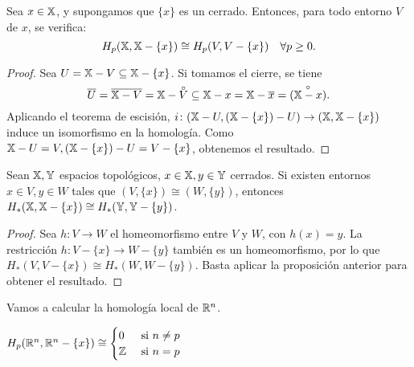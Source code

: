 \begin{proposition}
  Sea $x \in {\mathbb X}$, y supongamos que $\{x\}$ es un cerrado. Entonces, para todo entorno $V$ de $x$, se verifica:
  \[ H_p({\mathbb X}, {\mathbb X} - \{x\}) \cong H_p(V, V - \{x\}) \quad \forall p \geq 0. \]
\end{proposition}

\begin{proof}
  Sea $U = {\mathbb X} - V \subseteq {\mathbb X} - \{x\}$. Si tomamos el cierre, se tiene
  \[ \overline{U} = \overline{\X - V} = \X - \interior{V} \subseteq \X - x = \X - \overline{x} = \interior{(\X - x)} .\]
  Aplicando el teorema de escisión, $i \colon ({\mathbb X} - U, ({\mathbb X} - \{x\}) - U) \to ({\mathbb X}, {\mathbb X} - \{x\})$ induce un isomorfismo en la homología.
  Como ${\mathbb X} - U = V, ({\mathbb X} - \{x\}) - U = V - \{x\}$, obtenemos el resultado.
\end{proof}

\begin{proposition}
  Sean ${\mathbb X}, {\mathbb Y}$ espacios topológicos, $x \in {\mathbb X}, y \in {\mathbb Y}$ cerrados. Si existen entornos $x \in V, y \in W$ tales que $(V, \{x\}) \cong (W, \{y\})$,
  entonces $H_*({\mathbb X}, {\mathbb X} - \{x\}) \cong H_*({\mathbb Y}, {\mathbb Y} - \{y\})$.
\end{proposition}

\begin{proof}
  Sea $h \colon V \to W$ el homeomorfismo entre $V$ y $W$, con $h(x) = y$. La restricción $h \colon V - \{x\} \to W - \{y\}$ también es un homeomorfismo,
  por lo que $H_*(V, V - \{x\}) \cong H_*(W, W - \{y\})$. Basta aplicar la proposición anterior para obtener el resultado.
\end{proof}

Vamos a calcular la homología local de $\mathbb{R}^n$.

\begin{proposition}
  $H_p(\mathbb{R}^n, \mathbb{R}^n - \{x\}) \cong \begin{cases} 0 &\text{ si } n \neq p \\ \mathbb{Z} &\text{ si } n = p \end{cases}$
\end{proposition}

